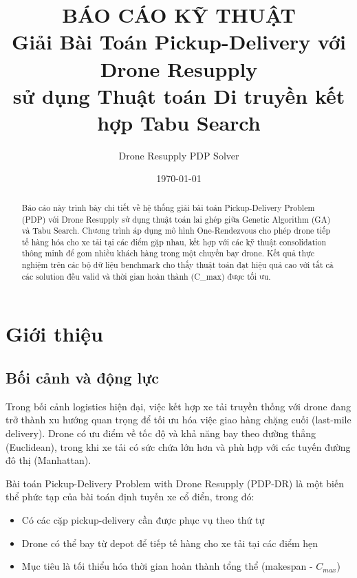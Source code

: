 \documentclass[12pt,a4paper]{article}
\title{\textbf{BÁO CÁO KỸ THUẬT} \\ \Large Giải Bài Toán Pickup-Delivery với Drone Resupply \\ sử dụng Thuật toán Di truyền kết hợp Tabu Search}
\author{Drone Resupply PDP Solver}
\date{\today}
\begin{document}
\maketitle

\begin{abstract}
Báo cáo này trình bày chi tiết về hệ thống giải bài toán Pickup-Delivery Problem (PDP) với Drone Resupply sử dụng thuật toán lai ghép giữa Genetic Algorithm (GA) và Tabu Search. Chương trình áp dụng mô hình One-Rendezvous cho phép drone tiếp tế hàng hóa cho xe tải tại các điểm gặp nhau, kết hợp với các kỹ thuật consolidation thông minh để gom nhiều khách hàng trong một chuyến bay drone. Kết quả thực nghiệm trên các bộ dữ liệu benchmark cho thấy thuật toán đạt hiệu quả cao với tất cả các solution đều valid và thời gian hoàn thành (C\_max) được tối ưu.
\end{abstract}

\tableofcontents
\newpage

\section{Giới thiệu}

\subsection{Bối cảnh và động lực}

Trong bối cảnh logistics hiện đại, việc kết hợp xe tải truyền thống với drone đang trở thành xu hướng quan trọng để tối ưu hóa việc giao hàng chặng cuối (last-mile delivery). Drone có ưu điểm về tốc độ và khả năng bay theo đường thẳng (Euclidean), trong khi xe tải có sức chứa lớn hơn và phù hợp với các tuyến đường đô thị (Manhattan).

Bài toán Pickup-Delivery Problem with Drone Resupply (PDP-DR) là một biến thể phức tạp của bài toán định tuyến xe cổ điển, trong đó:
\begin{itemize}
    \item Có các cặp pickup-delivery cần được phục vụ theo thứ tự
    \item Drone có thể bay từ depot để tiếp tế hàng cho xe tải tại các điểm hẹn
    \item Mục tiêu là tối thiểu hóa thời gian hoàn thành tổng thể (makespan - $C_{max}$)
\end{itemize}
\end{document}
